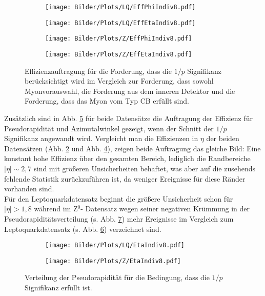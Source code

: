 \begin{figure}
  \begin{subfigure}[t]{0.55\textwidth}
  \texttt{[image: Bilder/Plots/LQ/EffPhiIndiv8.pdf]}
  \label{EffPhiIndiv8LQ}
  \end{subfigure}
\begin{subfigure}[t]{0.55\textwidth}
 \texttt{[image: Bilder/Plots/LQ/EffEtaIndiv8.pdf]}
  \label{EffEtaIndiv8LQ}
\end{subfigure}
\begin{subfigure}[t]{0.55\textwidth}
  \texttt{[image: Bilder/Plots/Z/EffPhiIndiv8.pdf]}
  \label{EffPhiIndiv8Z}
\end{subfigure}
\begin{subfigure}[t]{0.55\textwidth}
  \texttt{[image: Bilder/Plots/Z/EffEtaIndiv8.pdf]}
  \label{EffEtaIndiv8Z}
\end{subfigure}
\caption{Effizienzauftragung für die Forderung, dass die $1/p$ Signifikanz berücksichtigt wird im Vergleich zur Forderung, dass sowohl Myonvorauswahl, die Forderung aus dem inneren Detektor und die Forderung, dass das Myon vom Typ CB erfüllt sind.}
\label{EffEtaPhiIndiv8}
\end{figure}
Zusätzlich sind in Abb. \ref{EffEtaPhiIndiv8} für beide Datensätze die Auftragung der Effizienz für Pseudorapidität und Azimutalwinkel gezeigt, wenn der Schnitt der $1/p$ Signifikanz angewandt wird. Vergleicht man die Effizienzen in $\eta$ der beiden Datensätzen (Abb. \ref{EffEtaIndiv8LQ} und Abb. \ref{EffEtaIndiv8Z}), zeigen beide Auftragung das gleiche Bild: Eine konstant hohe Effizienz über den gesamten Bereich, lediglich die Rand\-bereiche $|\eta|\sim2{,}7$ sind mit größeren Unsicherheiten behaftet, was aber auf die zusehends fehlende Statistik zurückzuführen ist, da weniger Ereignisse für diese Ränder vorhanden sind.\\
Für den Leptoquarkdatensatz beginnt die größere Unsicherheit schon für $|\eta|>1{,}8$ während im Z$^0$- Datensatz wegen seiner negativen Krümmung in der Pseu\-dora\-pi\-di\-täts\-vertei\-lung (s. Abb. \ref{EtaIndiv8Z}) mehr Ereignisse im Vergleich zum Leptoquarkdatensatz (s. Abb. \ref{EtaIndiv8LQ}) verzeichnet sind.\\
\begin{figure}
  \begin{subfigure}[t]{0.55\textwidth}
  \texttt{[image: Bilder/Plots/LQ/EtaIndiv8.pdf]}
  \label{EtaIndiv8LQ}
  \end{subfigure}
\begin{subfigure}[t]{0.55\textwidth}
 \texttt{[image: Bilder/Plots/Z/EtaIndiv8.pdf]}
  \label{EtaIndiv8Z}
\end{subfigure}
\caption{Verteilung der Pseudorapidität für die Bedingung, dass die $1/p$ Signifikanz erfüllt ist.}
\label{EtaIndiv8}
\end{figure}
